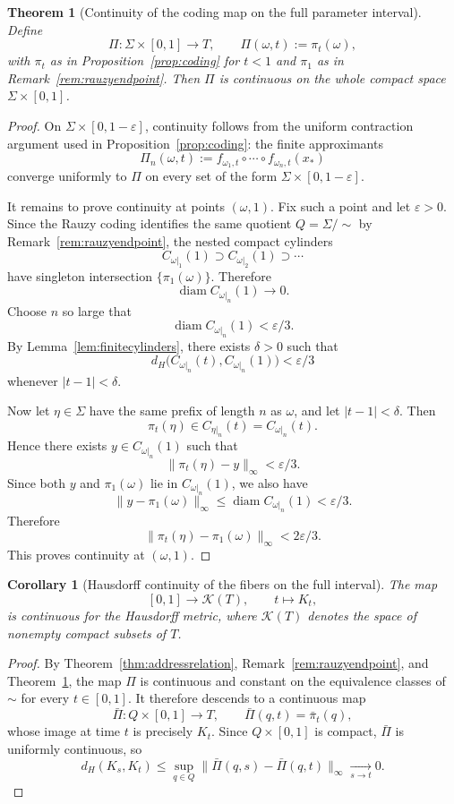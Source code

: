 \documentclass[11pt]{amsart}
\newtheorem{theorem}{Theorem}[section]
\newtheorem{corollary}[corollary]{Corollary}
\theoremstyle{definition}
\newcommand{\K}{\mathcal{K}}
\newcommand{\diam}{\operatorname{diam}}
\newcommand{\eps}{\varepsilon}
\begin{document}
\begin{theorem}[Continuity of the coding map on the full parameter interval]\label{thm:globalcodingcontinuity}
Define
\[
\Pi: \Sigma\times[0,1]\to T,\qquad \Pi(\omega,t):=\pi_t(\omega),
\]
with $\pi_t$ as in Proposition~\ref{prop:coding} for $t<1$ and $\pi_1$ as in Remark~\ref{rem:rauzyendpoint}. Then $\Pi$ is continuous on the whole compact space $\Sigma\times[0,1]$.
\end{theorem}

\begin{proof}
On $\Sigma\times[0,1-\eps]$, continuity follows from the uniform contraction argument used in Proposition~\ref{prop:coding}: the finite approximants
\[
\Pi_n(\omega,t):=f_{\omega_1,t}\circ\cdots\circ f_{\omega_n,t}(x_\ast)
\]
converge uniformly to $\Pi$ on every set of the form $\Sigma\times[0,1-\eps]$.

It remains to prove continuity at points $(\omega,1)$. Fix such a point and let $\varepsilon>0$. Since the Rauzy coding identifies the same quotient $Q=\Sigma/\!\sim$ by Remark~\ref{rem:rauzyendpoint}, the nested compact cylinders
\[
C_{\omega|_1}(1)\supset C_{\omega|_2}(1)\supset \cdots
\]
have singleton intersection $\{\pi_1(\omega)\}$. Therefore
\[
\diam C_{\omega|_n}(1)\longrightarrow 0.
\]
Choose $n$ so large that
\[
\diam C_{\omega|_n}(1)<\varepsilon/3.
\]
By Lemma~\ref{lem:finitecylinders}, there exists $\delta>0$ such that
\[
d_H\bigl(C_{\omega|_n}(t),C_{\omega|_n}(1)\bigr)<\varepsilon/3
\]
whenever $|t-1|<\delta$.

Now let $\eta\in\Sigma$ have the same prefix of length $n$ as $\omega$, and let $|t-1|<\delta$. Then
\[
\pi_t(\eta)\in C_{\eta|_n}(t)=C_{\omega|_n}(t).
\]
Hence there exists $y\in C_{\omega|_n}(1)$ such that
\[
\|\pi_t(\eta)-y\|_\infty<\varepsilon/3.
\]
Since both $y$ and $\pi_1(\omega)$ lie in $C_{\omega|_n}(1)$, we also have
\[
\|y-\pi_1(\omega)\|_\infty\le \diam C_{\omega|_n}(1)<\varepsilon/3.
\]
Therefore
\[
\|\pi_t(\eta)-\pi_1(\omega)\|_\infty<2\varepsilon/3.
\]
This proves continuity at $(\omega,1)$.
\end{proof}

\begin{corollary}[Hausdorff continuity of the fibers on the full interval]\label{cor:globalhausdorff}
The map
\[
[0,1]\to \K(T),\qquad t\mapsto K_t,
\]
is continuous for the Hausdorff metric, where $\K(T)$ denotes the space of nonempty compact subsets of $T$.
\end{corollary}

\begin{proof}
By Theorem~\ref{thm:addressrelation}, Remark~\ref{rem:rauzyendpoint}, and Theorem~\ref{thm:globalcodingcontinuity}, the map $\Pi$ is continuous and constant on the equivalence classes of $\sim$ for every $t\in[0,1]$. It therefore descends to a continuous map
\[
\bar\Pi:Q\times[0,1]\to T,\qquad \bar\Pi(q,t)=\bar\pi_t(q),
\]
whose image at time $t$ is precisely $K_t$. Since $Q\times[0,1]$ is compact, $\bar\Pi$ is uniformly continuous, so
\[
d_H(K_s,K_t)\le \sup_{q\in Q}\|\bar\Pi(q,s)-\bar\Pi(q,t)\|_\infty\xrightarrow[s\to t]{}0.
\]
\end{proof}
\end{document}
